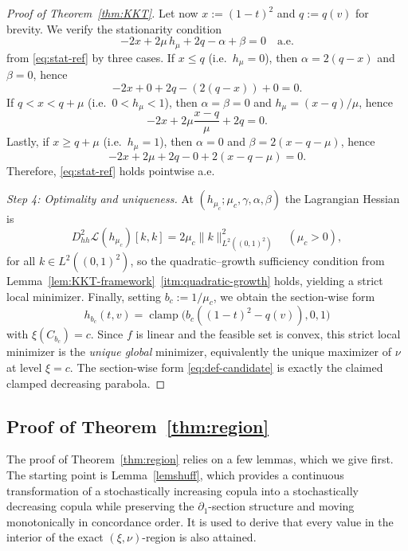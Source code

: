 \documentclass{article}
\DeclareMathOperator{\clamp}{clamp}
\newcommand{\1}{\mathds{1}}
\begin{document}
\begin{proof}[Proof of Theorem~\ref{thm:KKT}]
Let now $x:=(1-t)^2$ and $q:=q(v)$ for brevity.
We verify the stationarity condition
\[
  -2x+2\mu\,h_\mu+2q-\alpha+\beta=0 \quad\text{a.e.}
\]
from \eqref{eq:stat-ref} by three cases.
If $x\le q$ (i.e.\ $h_\mu=0$), then $\alpha=2(q-x)$ and $\beta=0$, hence
\[
 -2x+0+2q-(2(q-x))+0=0.
\]
If $q<x<q+\mu$ (i.e.\ $0<h_\mu<1$), then $\alpha=\beta=0$ and $h_\mu=(x-q)/\mu$, hence
\[
 -2x+2\mu\frac{x-q}{\mu}+2q=0.
\]
Lastly, if $x\ge q+\mu$ (i.e.\ $h_\mu=1$), then $\alpha=0$ and $\beta=2(x-q-\mu)$, hence
\[
 -2x+2\mu+2q-0+2(x-q-\mu)=0.
\]
Therefore, \eqref{eq:stat-ref} holds pointwise a.e.

\smallskip
\emph{Step 4: Optimality and uniqueness.}
At $(h_{\mu_c};\mu_c,\gamma,\alpha,\beta)$ the Lagrangian Hessian is
\[
  D^2_{hh}\mathcal{L}(h_{\mu_c})[k,k]=2\mu_c\|k\|_{L^2((0,1)^2)}^2\quad(\mu_c>0),
\]
for all $k\in L^2((0,1)^2)$, so the quadratic–growth sufficiency condition from Lemma~\ref{lem:KKT-framework}~\ref{itm:quadratic-growth} holds, yielding a strict local minimizer.
Finally, setting $b_c:=1/\mu_c$, we obtain the section-wise form
\[
h_{b_c}(t,v)=\clamp\!\big(b_c((1-t)^2-q(v)),0,1\big)
\]
with \(\xi(C_{b_c})=c\).
Since $f$ is linear and the feasible set is convex, this strict local minimizer is the \emph{unique global} minimizer, equivalently the unique maximizer of $\nu$ at level $\xi=c$.
The section-wise form \eqref{eq:def-candidate} is exactly the claimed clamped decreasing parabola.
\end{proof}

\subsection{Proof of Theorem~\ref{thm:region}}
\label{sec:proofs-region}


The proof of Theorem~\ref{thm:region} relies on a few lemmas, which we give first. 
The starting point is Lemma~\ref{lemshuff}, which provides a continuous transformation of a stochastically increasing copula into a stochastically decreasing copula while preserving the \(\partial_1\)-section structure and moving monotonically in concordance order.
It is used to derive that every value in the interior of the exact $(\xi,\nu)$-region is also attained.
\end{document}
